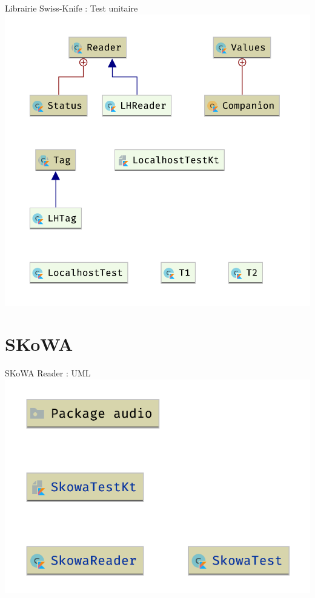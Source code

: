 \documentclass[aspectratio=169]{beamer}
\begin{document}
\begin{frame}{Librairie Swiss-Knife : Test unitaire}
  \centering
  \includegraphics[height=.9\textheight]{../assets/uml_test}
\end{frame}

\section{SKoWA}

\begin{frame}{SKoWA Reader : UML}
  \centering
  \includegraphics[height=.9\textheight]{../assets/uml_skowa_reader}
\end{frame}
\end{document}
